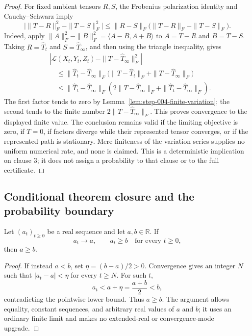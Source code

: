 \begin{proof}
For fixed ambient tensors $R,S$, the Frobenius polarization identity and
Cauchy--Schwarz imply
\[
\big|\|T-R\|_F^2-\|T-S\|_F^2\big|
\leq\|R-S\|_F\big(\|T-R\|_F+\|T-S\|_F\big).
\]
Indeed, apply
$\|A\|_F^2-\|B\|_F^2=\langle A-B,A+B\rangle$ to
$A=T-R$ and $B=T-S$.  Taking $R=\widehat T_t$ and
$S=\widehat T_\infty$, and then using the triangle inequality, gives
\[
\begin{aligned}
&\left|
\mathcal L(X_t,Y_t,Z_t)-\|T-\widehat T_\infty\|_F^2
\right|\\
&\quad\leq
\|\widehat T_t-\widehat T_\infty\|_F
\big(\|T-\widehat T_t\|_F+\|T-\widehat T_\infty\|_F\big)\\
&\quad\leq
\|\widehat T_t-\widehat T_\infty\|_F
\left(2\|T-\widehat T_\infty\|_F
+\|\widehat T_t-\widehat T_\infty\|_F\right).
\end{aligned}
\]
The first factor tends to zero by
Lemma~\ref{lem:step-004-finite-variation}; the second tends to the finite
number $2\|T-\widehat T_\infty\|_F$.  This proves convergence to the
displayed finite value.  The conclusion remains valid if the limiting
objective is zero, if $T=0$, if factors diverge while their represented
tensor converges, or if the represented path is stationary.  Mere finiteness
of the variation series supplies no uniform numerical rate, and none is
claimed.
This is a deterministic implication on clause 3; it does not assign a
probability to that clause or to the full certificate.
\end{proof}

\subsection{Conditional theorem closure and the probability boundary}
\label{app:step-005}

\begin{lemma}
\label{lem:step-005-limit-order}
Let $(a_t)_{t\geq0}$ be a real sequence and let $a,b\in\mathbb R$.  If
\[
a_t\longrightarrow a,
\qquad
a_t\geq b\quad\text{for every }t\geq0,
\]
then $a\geq b$.
\end{lemma}

\begin{proof}
If instead $a<b$, set $\eta=(b-a)/2>0$.  Convergence gives an integer $N$
such that $|a_t-a|<\eta$ for every $t\geq N$.  For such $t$,
\[
a_t<a+\eta=\frac{a+b}{2}<b,
\]
contradicting the pointwise lower bound.  Thus $a\geq b$.  The argument
allows equality, constant sequences, and arbitrary real values of $a$ and
$b$; it uses an ordinary finite limit and makes no extended-real or
convergence-mode upgrade.
\end{proof}

